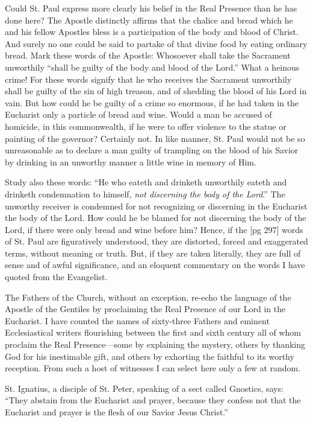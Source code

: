 Could St. Paul express more clearly his belief
in the Real Presence than he has done here? The
Apostle distinctly affirms that the chalice and
bread which he and his fellow Apostles bless is a
participation of the body and blood of Christ. And
surely no one could be said to partake of that divine
food by eating ordinary bread. Mark these
words of the Apostle: Whosoever shall take the
Sacrament unworthily “shall be guilty of the body
and blood of the Lord.” What a heinous crime!
For these words signify that he who receives the
Sacrament unworthily shall be guilty of the sin of
high treason, and of shedding the blood of his
Lord in vain. But how could he be guilty of a
crime so enormous, if he had taken in the Eucharist
only a particle of bread and wine. Would a
man be accused of homicide, in this commonwealth,
if he were to offer violence to the statue or painting
of the governor? Certainly not. In like manner,
St. Paul would not be so unreasonable as to
declare a man guilty of trampling on the blood of
his Savior by drinking in an unworthy manner a
little wine in memory of Him.

Study also these words: “He who eateth and
drinketh unworthily eateth and drinketh condemnation
to himself, \emph{not discerning the body of the
Lord}.” The unworthy receiver is condemned for
not recognizing or discerning in the Eucharist the
body of the Lord. How could he be blamed for
not discerning the body of the Lord, if there were
only bread and wine before him? Hence, if the
[pg 297]
words of St. Paul are figuratively understood, they
are distorted, forced and exaggerated terms, without
meaning or truth. But, if they are taken literally,
they are full of sense and of awful significance,
and an eloquent commentary on the words
I have quoted from the Evangelist.

The Fathers of the Church, without an exception,
re-echo the language of the Apostle of the
Gentiles by proclaiming the Real Presence of our
Lord in the Eucharist. I have counted the names
of sixty-three Fathers and eminent Ecclesiastical
writers flourishing between the first and sixth century
all of whom proclaim the Real Presence—some
by explaining the mystery, others by thanking
God for his inestimable gift, and others by exhorting
the faithful to its worthy reception. From
such a host of witnesses I can select here only a
few at random.

St. Ignatius, a disciple of St. Peter, speaking of
a sect called Gnostics, says: “They abstain from
the Eucharist and prayer, because they confess
not that the Eucharist and prayer is the flesh of
our Savior Jesus Christ.”

